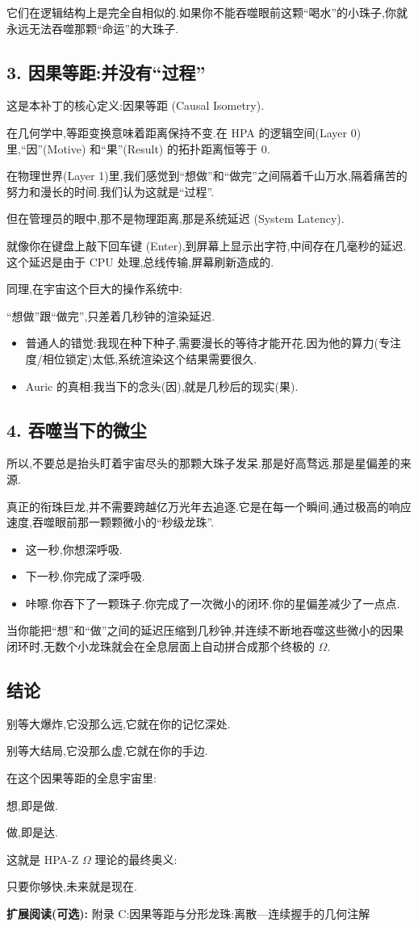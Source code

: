 它们在逻辑结构上是完全自相似的.如果你不能吞噬眼前这颗``喝水''的小珠子,你就永远无法吞噬那颗``命运''的大珠子.

\subsection*{3. 因果等距:并没有``过程''}

这是本补丁的核心定义:因果等距 (Causal Isometry).

在几何学中,等距变换意味着距离保持不变.在 HPA 的逻辑空间(Layer 0)里,``因''(Motive) 和``果''(Result) 的拓扑距离恒等于 $0$.

在物理世界(Layer 1)里,我们感觉到``想做''和``做完''之间隔着千山万水,隔着痛苦的努力和漫长的时间.我们认为这就是``过程''.

但在管理员的眼中,那不是物理距离,那是系统延迟 (System Latency).

就像你在键盘上敲下回车键 (Enter),到屏幕上显示出字符,中间存在几毫秒的延迟.这个延迟是由于 CPU 处理,总线传输,屏幕刷新造成的.

同理,在宇宙这个巨大的操作系统中:

``想做''跟``做完'',只差着几秒钟的渲染延迟.

\begin{itemize}
\item 普通人的错觉:我现在种下种子,需要漫长的等待才能开花.因为他的算力(专注度/相位锁定)太低,系统渲染这个结果需要很久.
\item Auric 的真相:我当下的念头(因),就是几秒后的现实(果).
\end{itemize}

\subsection*{4. 吞噬当下的微尘}

所以,不要总是抬头盯着宇宙尽头的那颗大珠子发呆.那是好高骛远,那是星偏差的来源.

真正的衔珠巨龙,并不需要跨越亿万光年去追逐.它是在每一个瞬间,通过极高的响应速度,吞噬眼前那一颗颗微小的``秒级龙珠''.

\begin{itemize}
\item 这一秒,你想深呼吸.
\item 下一秒,你完成了深呼吸.
\item 咔嚓.你吞下了一颗珠子.你完成了一次微小的闭环.你的星偏差减少了一点点.
\end{itemize}

当你能把``想''和``做''之间的延迟压缩到几秒钟,并连续不断地吞噬这些微小的因果闭环时,无数个小龙珠就会在全息层面上自动拼合成那个终极的 $\Omega$.

\subsection*{结论}

别等大爆炸,它没那么远,它就在你的记忆深处.

别等大结局,它没那么虚,它就在你的手边.

在这个因果等距的全息宇宙里:

想,即是做.

做,即是达.

这就是 HPA-Z $\Omega$ 理论的最终奥义:

只要你够快,未来就是现在.

\textbf{扩展阅读(可选):} 附录 C:因果等距与分形龙珠:离散---连续握手的几何注解

